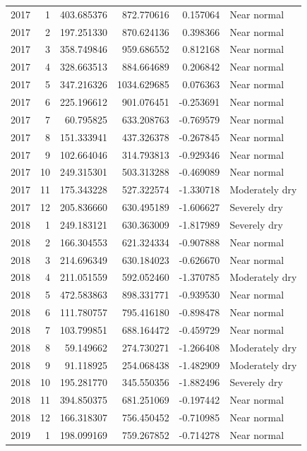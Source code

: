 \begin{tabular}{rrrrrl}
2017 & 1 & 403.685376 & 872.770616 & 0.157064 & Near normal \\
2017 & 2 & 197.251330 & 870.624136 & 0.398366 & Near normal \\
2017 & 3 & 358.749846 & 959.686552 & 0.812168 & Near normal \\
2017 & 4 & 328.663513 & 884.664689 & 0.206842 & Near normal \\
2017 & 5 & 347.216326 & 1034.629685 & 0.076363 & Near normal \\
2017 & 6 & 225.196612 & 901.076451 & -0.253691 & Near normal \\
2017 & 7 & 60.795825 & 633.208763 & -0.769579 & Near normal \\
2017 & 8 & 151.333941 & 437.326378 & -0.267845 & Near normal \\
2017 & 9 & 102.664046 & 314.793813 & -0.929346 & Near normal \\
2017 & 10 & 249.315301 & 503.313288 & -0.469089 & Near normal \\
2017 & 11 & 175.343228 & 527.322574 & -1.330718 & Moderately dry \\
2017 & 12 & 205.836660 & 630.495189 & -1.606627 & Severely dry \\
2018 & 1 & 249.183121 & 630.363009 & -1.817989 & Severely dry \\
2018 & 2 & 166.304553 & 621.324334 & -0.907888 & Near normal \\
2018 & 3 & 214.696349 & 630.184023 & -0.626670 & Near normal \\
2018 & 4 & 211.051559 & 592.052460 & -1.370785 & Moderately dry \\
2018 & 5 & 472.583863 & 898.331771 & -0.939530 & Near normal \\
2018 & 6 & 111.780757 & 795.416180 & -0.898478 & Near normal \\
2018 & 7 & 103.799851 & 688.164472 & -0.459729 & Near normal \\
2018 & 8 & 59.149662 & 274.730271 & -1.266408 & Moderately dry \\
2018 & 9 & 91.118925 & 254.068438 & -1.482909 & Moderately dry \\
2018 & 10 & 195.281770 & 345.550356 & -1.882496 & Severely dry \\
2018 & 11 & 394.850375 & 681.251069 & -0.197442 & Near normal \\
2018 & 12 & 166.318307 & 756.450452 & -0.710985 & Near normal \\
2019 & 1 & 198.099169 & 759.267852 & -0.714278 & Near normal \\

\end{tabular}
